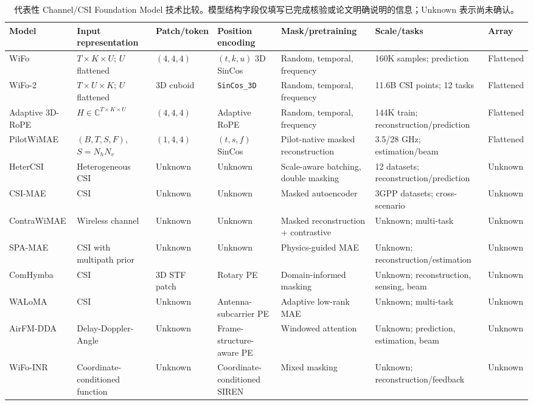 \documentclass[journal]{IEEEtran}
\begin{document}
\begin{table}[!t]
\caption{代表性 Channel/CSI Foundation Model 技术比较。模型结构字段仅填写已完成核验或论文明确说明的信息；Unknown 表示尚未确认。}
\label{tab:cfm-tech}
\centering
\scriptsize
\begin{tabular}{L{2.20cm}L{1.80cm}L{1.70cm}L{1.70cm}L{2.30cm}L{2.20cm}L{1.40cm}}
\toprule
Model & Input representation & Patch/token & Position encoding & Mask/pretraining & Scale/tasks & Array \\
\midrule
WiFo \cite{liu2025wifo} & \(T\times K\times U\); \(U\) flattened & \((4,4,4)\) & \((t,k,u)\) 3D SinCos & Random, temporal, frequency & 160K samples; prediction & Flattened \\
WiFo-2 \cite{liu2026wifo2} & \(T\times U\times K\); \(U\) flattened & 3D cuboid & \texttt{SinCos\_3D} & Random, temporal, frequency & 11.6B CSI points; 12 tasks & Flattened \\
Adaptive 3D-RoPE \cite{zhang2026adaptive3drope} & \(H\in\mathbb{C}^{T\times K\times U}\) & \((4,4,4)\) & Adaptive RoPE & Random, temporal, frequency & 144K train; reconstruction/prediction & Flattened \\
PilotWiMAE \cite{guler2026pilotwimae} & \((B,T,S,F)\), \(S=N_hN_v\) & \((1,4,4)\) & \((t,s,f)\) SinCos & Pilot-native masked reconstruction & 3.5/28 GHz; estimation/beam & Flattened \\
HeterCSI \cite{jiang2026hetercsi} & Heterogeneous CSI & Unknown & Unknown & Scale-aware batching, double masking & 12 datasets; reconstruction/prediction & Unknown \\
CSI-MAE \cite{jiang2026csimae} & CSI & Unknown & Unknown & Masked autoencoder & 3GPP datasets; cross-scenario & Unknown \\
ContraWiMAE \cite{guler2026contrawimae} & Wireless channel & Unknown & Unknown & Masked reconstruction + contrastive & Unknown; multi-task & Unknown \\
SPA-MAE \cite{chen2026spamae} & CSI with multipath prior & Unknown & Unknown & Physics-guided MAE & Unknown; reconstruction/estimation & Unknown \\
ComHymba \cite{yang2026comhymba} & CSI & 3D STF patch & Rotary PE & Domain-informed masking & Unknown; reconstruction, sensing, beam & Unknown \\
WALoMA \cite{makin2026waloma} & CSI & Unknown & Antenna-subcarrier PE & Adaptive low-rank MAE & Unknown; multi-task & Unknown \\
AirFM-DDA \cite{bian2026airfmdda} & Delay-Doppler-Angle & Unknown & Frame-structure-aware PE & Windowed attention & Unknown; prediction, estimation, beam & Unknown \\
WiFo-INR \cite{liu2026wifoinr} & Coordinate-conditioned function & Unknown & Coordinate-conditioned SIREN & Mixed masking & Unknown; reconstruction/feedback & Unknown \\
\bottomrule
\end{tabular}
\end{table}
\end{document}
